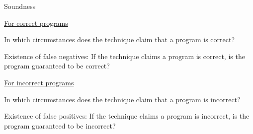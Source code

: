 \documentclass[a4paper]{article}
\begin{document}
\begin{minipage}[t]{0.16\linewidth}
\begin{betterlist}
		\item \alert{Soundness}
		\begin{betterlist}
			\item \underline{For correct programs}
			\begin{betterlist}
				\item In which circumstances does the technique claim that a program is correct?

				\item Existence of false negatives: If the technique claims a program is correct, is the program guaranteed to be correct?

			\end{betterlist}
			\item \underline{For incorrect programs}
			\begin{betterlist}
				\item In which circumstances does the technique claim that a program is incorrect?

				\framebox[0.90\textwidth][l]{\parbox{0.85\textwidth}{
						\begin{betterlist}
							\item not in lecture
						\end{betterlist}
					}}
				\item Existence of false positives: If the technique claims a program is incorrect, is the program guaranteed to be incorrect?


\end{betterlist}
\end{betterlist}
\end{betterlist}
\end{minipage}
\end{document}
